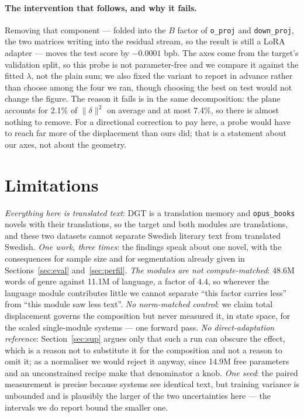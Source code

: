 \documentclass[10pt,twocolumn,a4paper]{article}
\newcommand{\tec}[1]{{\small\texttt{#1}}}
\begin{document}
\paragraph{The intervention that follows, and why it fails.} Removing that
component --- folded into the $B$ factor of \tec{o\_proj} and \tec{down\_proj},
the two matrices writing into the residual stream, so the result is still a LoRA
adapter --- moves the test score by $-0.0001$ bpb. The axes come from the
target's validation split, so this probe is not parameter-free and we compare it
against the fitted $\lambda$, not the plain sum; we also fixed the variant to
report in advance rather than choose among the four we ran, though choosing the
best on test would not change the figure. The reason it fails is in the same
decomposition: the plane accounts for 2.1\% of $\lVert\delta\rVert^2$ on average
and at most 7.4\%, so there is almost nothing to remove. For a directional
correction to pay here, a probe would have to reach far more of the displacement
than ours did; that is a statement about our axes, not about the geometry.

\section{Limitations}

\emph{Everything here is translated text}: DGT is a
translation memory and \tec{opus\_books} novels with their translations, so the
target and both modules are translations, and these two datasets cannot separate
Swedish literary text from translated Swedish. \emph{One work, three times}: the
findings speak about one novel, with the consequences for sample size and for
segmentation already given in Sections~\ref{sec:eval} and~\ref{sec:perfil}. \emph{The modules are not
compute-matched}: 48.6M words of genre against 11.1M of language, a factor of
$4.4$, so wherever the language module contributes little we cannot separate
``this factor carries less'' from ``this module saw less text''. \emph{No norm-matched control}: we claim total displacement governs the
composition but never measured it, in state space, for the scaled single-module
systems --- one forward pass. \emph{No
direct-adaptation reference}: Section~\ref{sec:sup} argues only that such a run
can obscure the effect, which is a reason not to substitute it for the
composition and not a reason to omit it; as a normaliser we would reject it
anyway, since 14.9M free parameters and an unconstrained recipe make that
denominator a knob. \emph{One seed}: the paired measurement is precise because systems see
identical text, but training variance is unbounded and is plausibly the larger
of the two uncertainties here --- the intervals we do report bound the smaller
one.
\end{document}
